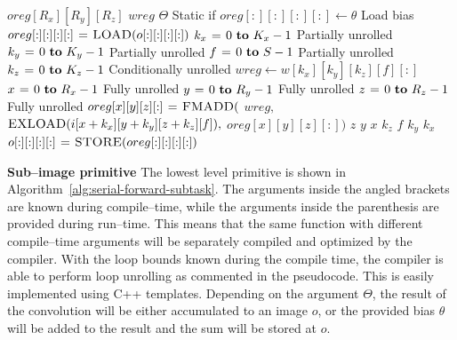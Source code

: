   \begin{algorithm}
    {\footnotesize
      \begin{codebox}
        \li {} $oreg[R_x][R_y][R_z]$
        \li {} $wreg$
        \li \If $\Theta$ \Comment Static if
        \li \Then $oreg[:][:][:][:] \gets \theta$ \Comment Load bias
        \li \Else
        \li       $oreg[:][:][:][:] \mathrel{\hspace{1pt}=\hspace{1pt}} \textnormal{\scshape LOAD}(o[:][:][:][:])$
        \End \li {}
        \li {} $k_x \gets 0 \To K_x-1$ \Comment Partially unrolled
        \li   \Do {} $k_y \gets 0 \To K_y-1$  \Comment Partially unrolled
        \li     \Do {} $f \gets 0 \To S - 1$ \Comment Partially unrolled
        \li       \Do {} $k_z \gets 0 \To K_z-1$  \Comment Conditionally unrolled
        \li         \Do $wreg \gets w[k_x][k_y][k_z][f][:]$
        \li {} $x \gets 0 \To R_x-1$ \Comment Fully unrolled
        \li   \Do {} $y \gets 0 \To R_y-1$ \Comment Fully unrolled
        \li      \Do {} $z \gets 0 \To R_z-1$ \Comment Fully unrolled
        \li         \Do $oreg[x][y][z][:] \mathrel{\hspace{1pt}=\hspace{1pt}} \textnormal{\scshape FMADD}($
        \li       $wreg,$
        \li       $\textnormal{\scshape EXLOAD}(i[x+k_x][y+k_y][z+k_z][f]),$
        \li       $oreg[x][y][z][:])$
        \End \li {} $z$
        \End \li {} $y$
        \End \li {} $x$
        \End \li {} $k_z$
        \End \li {} $f$
        \End \li {} $k_y$
        \End \li {} $k_x$
        \li $o[:][:][:][:] \mathrel{\hspace{1pt}=\hspace{1pt}} \textnormal{\scshape STORE}(oreg[:][:][:][:])$
      \end{codebox}
    \caption{The finest granularity primitive that computes a
      sub--image of size $R_x \times R_y \times R_z$ of $S$ images by
      performing $S^2$ convolutions on $S$ input images with kernels
      of size $K_x \times K_y \times K_z$.}
    \label{alg:serial-forward-subtask}
    }
  \end{algorithm}

  {\bf Sub--image primitive} \quad The lowest level primitive is shown
  in Algorithm~\ref{alg:serial-forward-subtask}.  The arguments inside
  the angled brackets are known during compile--time, while the
  arguments inside the parenthesis are provided during run--time.
  This means that the same function with different compile--time
  arguments will be separately compiled and optimized by the compiler.
  With the loop bounds known during the compile time, the compiler is
  able to perform loop unrolling as commented in the pseudocode.  This
  is easily implemented using C++ templates.  Depending on the
  argument $\Theta$, the result of the convolution will be either
  accumulated to an image $o$, or the provided bias $\theta$ will be
  added to the result and the sum will be stored at $o$.

